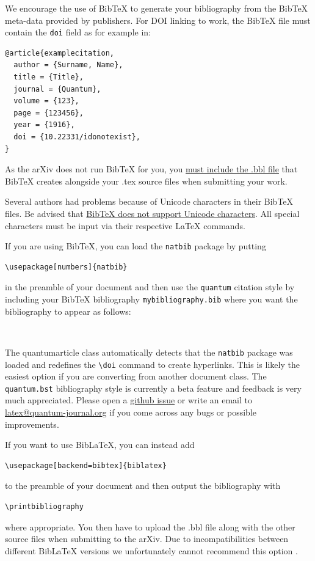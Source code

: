 \documentclass[a4paper,twocolumn,11pt,accepted=2017-05-09]{quantumarticle}
\begin{document}
We encourage the use of BibTeX to generate your bibliography from the BibTeX meta-data provided by publishers.
For DOI linking to work, the BibTeX file must contain the \texttt{doi} field as for example in:
\begin{verbatim}
@article{examplecitation,
  author = {Surname, Name},
  title = {Title},
  journal = {Quantum},
  volume = {123},
  page = {123456},
  year = {1916},
  doi = {10.22331/idonotexist},
}
\end{verbatim}
As the arXiv does not run BibTeX for you, you \href{https://arxiv.org/help/submit_tex}{must include the .bbl file} that BibTeX creates alongside your .tex source files when submitting your work.

Several authors had problems because of Unicode characters in their BibTeX files.
Be advised that \href{http://wiki.lyx.org/BibTeX/Tips}{BibTeX does not support Unicode characters}.
All special characters must be input via their respective LaTeX commands.

If you are using BibTeX, you can load the \texttt{natbib} package by putting
\begin{verbatim}
\usepackage[numbers]{natbib}
\end{verbatim}
in the preamble of your document and then use the \texttt{quantum} citation style by including your BibTeX bibliography \texttt{mybibliography.bib} where you want the bibliography to appear as follows:
\begin{verbatim}


\end{verbatim}
The quantumarticle class automatically detects that the \texttt{natbib} package was loaded and redefines the \texttt{\textbackslash{}doi} command to create hyperlinks.
This is likely the easiest option if you are converting from another document class.
The \texttt{quantum.bst} bibliography style is currently a beta feature and feedback is very much appreciated. Please open a \href{https://github.com/quantum-journal/quantum-journal/issues}{github issue} or write an email to \href{mailto:latex@quantum-journal.org}{latex@quantum-journal.org} if you come across any bugs or possible improvements.

If you want to use BibLaTeX, you can instead add
\begin{verbatim}
\usepackage[backend=bibtex]{biblatex}

\end{verbatim}
to the preamble of your document and then output the bibliography with
\begin{verbatim}
\printbibliography
\end{verbatim}
where appropriate.
You then have to upload the .bbl file along with the other source files when submitting to the arXiv.
Due to incompatibilities between different BibLaTeX versions we unfortunately cannot recommend this option \cite{biblatexsubmittingtothearxiv}.
\end{document}
